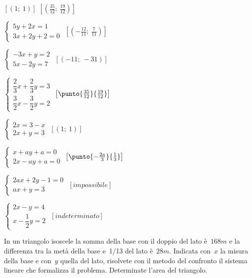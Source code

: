 \begin{esercizio}[\Ast]
\begin{multicols}{2}
\begin{enumeratea}
 \hfill \(\left[(1;~1)\right]\)
 \hfill \(\left[\left(\frac{35}{12};~\frac{19}{12}\right)\right]\)
 \item \(\left\{\begin{array}{l}5y+2x=1 \\3x+2y+2=0\end{array}\right.\)
 \hfill \(\left[\left(-{\frac{12}{11}};~\frac{7}{11}\right)\right]\)
 \item \(\left\{\begin{array}{l}-3x+y=2\\5x-2y=7\end{array}\right.\)
 \hfill \(\left[(-11;~-31)\right]\)
 \item \(\left\{\begin{array}{l}
 \dfrac{2}{3}x+\dfrac{2}{3}y=3\\
 \dfrac{3}{2}x-\dfrac{3}{2}y=2\end{array}\right.\)
 \hfill \(\left[\punto{\frac{35}{12}}{\frac{19}{12}}\right]\)
 \item \(\left\{\begin{array}{l}2x=3-x\\2x+y=3\end{array}\right.\)
 \hfill \(\left[(1;~1)\right]\)
 \item \(\left\{\begin{array}{l}x+ay+a=0\\2x-ay+a=0\end{array}\right.\)
 \hfill \(\left[\punto{-\frac{2a}{3}}{\-\frac{1}{3}}\right]\)
 \item \(\left\{\begin{array}{l}2ax+2y-1=0\\ax+y=3\end{array}\right.\)
 \hfill \(\left[impossibile\right]\)
 \item \(\left\{\begin{array}{l}2x-y=4\\x-\dfrac{1}{2}y=2\end{array}\right.\)
 \hfill \(\left[indeterminato\right]\)
\end{enumeratea}
 \end{multicols}
\end{esercizio}

\begin{esercizio}
 \label{ese:22.19}
In un triangolo isoscele la somma della base con il doppio del lato
è~\(168\unit{m}\) e la differenza tra la metà della base e~1/13 del lato 
è~\(28\unit{m}\).
Indicata con~\(x\) la misura della base e con~\(y\) quella del lato,
risolvete con il metodo del confronto il sistema lineare che formalizza
il problema. Determinate l'area del triangolo.
 \end{esercizio}

